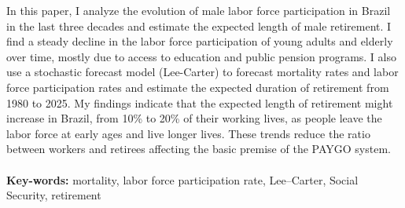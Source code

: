 \documentclass[12pt, 						%
			openright, 					%
			twoside,					%
			a4paper,x					%
			english,					%
			brazil]{abntex2}				%
\begin{document}

\begin{resumo}[Abstract]
In this paper, I analyze the evolution of male labor force participation in Brazil in the last three decades and estimate the expected length of male retirement. I find a steady decline in the labor force participation of young adults and elderly over time, mostly due to access to education and public pension programs. I also use a stochastic forecast model (Lee-Carter) to forecast mortality rates and labor force participation rates and estimate the expected duration of retirement from 1980 to 2025. My findings indicate that the expected length of retirement might increase in Brazil, from 10\% to 20\% of their working lives, as people leave the labor force at early ages and live longer lives. These trends  reduce the ratio between workers and retirees affecting the basic premise of the PAYGO system. 
\\ \\
\textbf{Key-words:} mortality, labor force participation rate, Lee--Carter, Social Security, retirement
\end{resumo}


	\tableofcontents*
\cleardoublepage	

\textual		%
\end{document}

